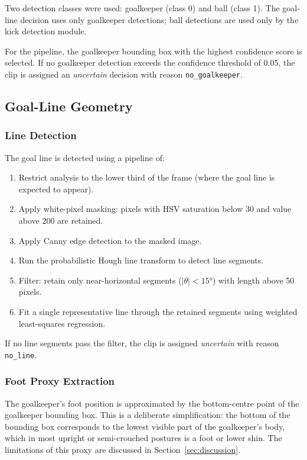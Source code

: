 \documentclass[12pt,a4paper,twoside]{article}
\begin{document}
Two detection classes were used: goalkeeper (class 0) and ball (class 1).
The goal-line decision uses only goalkeeper detections; ball detections are
used only by the kick detection module.

For the pipeline, the goalkeeper bounding box with the highest confidence score
is selected. If no goalkeeper detection exceeds the confidence threshold of 0.05,
the clip is assigned an \textit{uncertain} decision with reason \texttt{no\_goalkeeper}.

\subsection{Goal-Line Geometry}

\subsubsection{Line Detection}

The goal line is detected using a pipeline of:
\begin{enumerate}
  \item Restrict analysis to the lower third of the frame (where the goal line
        is expected to appear).
  \item Apply white-pixel masking: pixels with HSV saturation below 30 and
        value above 200 are retained.
  \item Apply Canny edge detection to the masked image.
  \item Run the probabilistic Hough line transform to detect line segments.
  \item Filter: retain only near-horizontal segments ($|\theta| < 15°$) with
        length above 50 pixels.
  \item Fit a single representative line through the retained segments using
        weighted least-squares regression.
\end{enumerate}

If no line segments pass the filter, the clip is assigned \textit{uncertain}
with reason \texttt{no\_line}.

\subsubsection{Foot Proxy Extraction}

The goalkeeper's foot position is approximated by the bottom-centre point of
the goalkeeper bounding box. This is a deliberate simplification: the bottom
of the bounding box corresponds to the lowest visible part of the goalkeeper's
body, which in most upright or semi-crouched postures is a foot or lower shin.
The limitations of this proxy are discussed in Section~\ref{sec:discussion}.
\end{document}
